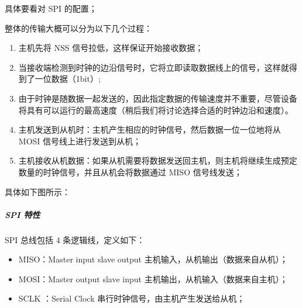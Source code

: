 \documentclass[a4paper,12pt,english]{sphinxmanual}
\begin{document}
{{\sphinxAtStartPar
具体要看对 SPI 的配置；

\sphinxAtStartPar
整体的传输大概可以分为以下几个过程：
\begin{enumerate}
%
\item {} 
\sphinxAtStartPar
主机先将 NSS 信号拉低，这样保证开始接收数据；

\item {} 
\sphinxAtStartPar
当接收端检测到时钟的边沿信号时，它将立即读取数据线上的信号，这样就得到了一位数据（1bit）;

\item {} 
\sphinxAtStartPar
由于时钟是随数据一起发送的，因此指定数据的传输速度并不重要，尽管设备将具有可以运行的最高速度（稍后我们将讨论选择合适的时钟边沿和速度）。

\item {} 
\sphinxAtStartPar
主机发送到从机时：主机产生相应的时钟信号，然后数据一位一位地将从 MOSI 信号线上进行发送到从机；

\item {} 
\sphinxAtStartPar
主机接收从机数据：如果从机需要将数据发送回主机，则主机将继续生成预定数量的时钟信号，并且从机会将数据通过 MISO 信号线发送；

\end{enumerate}

\sphinxAtStartPar
具体如下图所示：

\sphinxAtStartPar
{}
\begin{quote}

\sphinxAtStartPar
{}

\sphinxAtStartPar
{}
\end{quote}


\subparagraph{SPI 特性}
\label{\detokenize{exp-esp32/peripherals/lcd_spi:id3}}
\sphinxAtStartPar
SPI 总线包括 4 条逻辑线，定义如下：
\begin{itemize}
\item {} 
\sphinxAtStartPar
MISO：Master input slave output 主机输入，从机输出（数据来自从机）；

\item {} 
\sphinxAtStartPar
MOSI：Master output slave input 主机输出，从机输入（数据来自主机）；

\item {} 
\sphinxAtStartPar
SCLK ：Serial Clock 串行时钟信号，由主机产生发送给从机；


\end{itemize}}}
\end{document}

